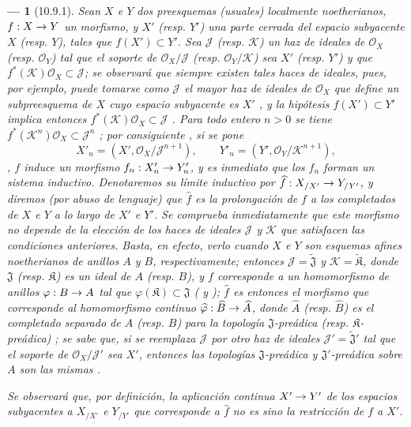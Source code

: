 \documentclass[oneside]{amsart}
\theoremstyle{ega-env-style}
\newtheorem*{env}{---}
\theoremstyle{ega-thm-env-style}
\theoremstyle{ega-defn-env-style}
\renewcommand{\to}{\mathchoice{\longrightarrow}{\rightarrow}{\rightarrow}{\rightarrow}}
\newcommand{\oldpage}[2][]{{\marginnote{\normalfont{\textbf{#1}~|~#2}}}\ignorespaces}
\let\EGAOriginalLabel\label
\renewcommand{\label}[1]{\phantomsection\EGAOriginalLabel{#1}}
\begin{document}
\begin{env}[10.9.1]
\label{I.10.9.1}
Sean $X$ e $Y$ dos preesquemas (usuales) localmente noetherianos, $f:X\to Y$ un morfismo, y $X'$ (resp. $Y'$) una parte cerrada del espacio subyacente $X$ (resp. $Y$), tales que $f(X')\subset Y'$.
Sea $\mathscr{J}$ (resp. $\mathscr{K}$) un haz de ideales de $\mathscr{O}_X$ (resp. $\mathscr{O}_Y$) tal que el soporte de $\mathscr{O}_X/\mathscr{J}$ (resp. $\mathscr{O}_Y/\mathscr{K}$) sea $X'$ (resp. $Y'$) y que $f^*(\mathscr{K})\mathscr{O}_X\subset\mathscr{J}$; se observará que siempre existen tales haces de ideales, pues, por ejemplo, puede tomarse como $\mathscr{J}$ el mayor haz de ideales de $\mathscr{O}_X$ que define un subpreesquema de $X$ cuyo espacio subyacente es $X'$ , y la hipótesis $f(X')\subset Y'$ implica entonces $f^*(\mathscr{K})\mathscr{O}_X\subset\mathscr{J}$ .
Para todo entero $n>0$ se tiene $f^*(\mathscr{K}^n)\mathscr{O}_X\subset\mathscr{J}^n$ ; por consiguiente , si se pone \[
  X'_n=(X',\mathscr{O}_X/\mathscr{J}^{n+1}),\qquad
  Y'_n=(Y',\mathscr{O}_Y/\mathscr{K}^{n+1}),
\], $f$ induce un morfismo $f_n:X'_n\to Y'_n$, y es inmediato que los $f_n$ forman un sistema inductivo.
Denotaremos su límite inductivo  por $\widehat f:X_{/X'}\to Y_{/Y'}$, y diremos (por abuso de lenguaje) que $\widehat f$ es la \emph{prolongación de $f$ a los completados de $X$ e $Y$ a lo largo de $X'$ e $Y'$}.
Se comprueba inmediatamente que este morfismo no depende de la elección de los haces de ideales $\mathscr{J}$ y $\mathscr{K}$ que satisfacen las condiciones anteriores.
Basta, en efecto, verlo cuando $X$ e $Y$ son esquemas afines noetherianos de anillos $A$ y $B$, respectivamente; entonces $\mathscr{J}=\widetilde{\mathfrak{J}}$ y $\mathscr{K}=\widetilde{\mathfrak{K}}$, donde $\mathfrak{J}$ (resp. $\mathfrak{K}$) es un ideal de $A$ (resp. $B$), y $f$ corresponde a un homomorfismo de anillos $\varphi:B\to A$ tal que $\varphi(\mathfrak{K})\subset\mathfrak{J}$ ( y ); \emph{$\widehat f$ es entonces el morfismo que corresponde  al homomorfismo continuo $\widehat\varphi:\widehat B\to\widehat A$}, donde $\widehat A$ (resp. $\widehat B$) es el completado separado de $A$ (resp. $B$) para la topología $\mathfrak{J}$-preádica (resp. $\mathfrak{K}$-preádica) ; se sabe que, si se reemplaza $\mathscr{J}$ por otro
\oldpage[I]{199}
haz de ideales $\mathscr{J}'=\widetilde{\mathfrak{J}}'$ tal que el soporte de $\mathscr{O}_X/\mathscr{J}'$ sea $X'$, entonces las topologías $\mathfrak{J}$-preádica y $\mathfrak{J}'$-preádica sobre $A$ son las mismas .

Se observará que, por definición, la aplicación continua $X'\to Y'$ de los espacios subyacentes a $X_{/X'}$ e $Y_{/Y'}$ que corresponde a $\widehat f$ no es sino la restricción de $f$ a $X'$.
\end{env}
\end{document}
